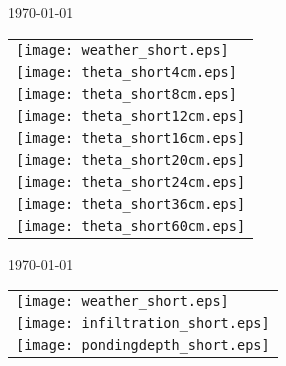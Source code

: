 \documentclass[a4paper]{article}
\begin{document}
\newpage
\today \\
%
\begin{tabular}{l}
\texttt{[image: weather\_short.eps]} \\
\texttt{[image: theta\_short4cm.eps]} \\
\texttt{[image: theta\_short8cm.eps]} \\
\texttt{[image: theta\_short12cm.eps]} \\
\texttt{[image: theta\_short16cm.eps]} \\
\texttt{[image: theta\_short20cm.eps]} \\
\texttt{[image: theta\_short24cm.eps]} \\
\texttt{[image: theta\_short36cm.eps]} \\
\texttt{[image: theta\_short60cm.eps]}
\end{tabular}

\newpage
\today \\
%
\begin{tabular}{l}
\texttt{[image: weather\_short.eps]} \\
\texttt{[image: infiltration\_short.eps]} \\
\texttt{[image: pondingdepth\_short.eps]} \\
\end{tabular}
\end{document}
